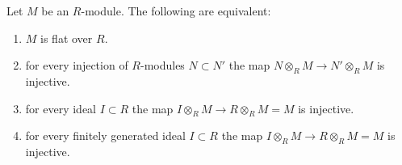 %
\begin{lemma}
\label{lemma-flat}
Let $M$ be an $R$-module. The following are equivalent:
\begin{enumerate}
\item
\label{item-flat}
$M$ is flat over $R$.
\item
\label{item-injective}
for every injection of $R$-modules $N \subset N'$
the map $N \otimes_R M \to N'\otimes_R M$ is injective.
\item
\label{item-f-ideal}
for every ideal $I \subset R$ the map
$I \otimes_R M \to R \otimes_R M = M$ is injective.
\item
\label{item-ffg-ideal}
for every finitely generated ideal $I \subset R$
the map $I \otimes_R M \to R \otimes_R M = M$ is injective.
\end{enumerate}
\end{lemma}

